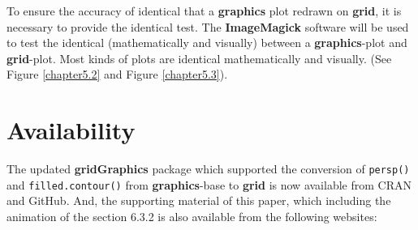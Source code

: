 \documentclass[11pt,twoside]{report}
\begin{document}
To ensure the accuracy of identical that a \textbf{graphics} plot redrawn on \textbf{grid}, it is necessary to provide the identical test. The \textbf{ImageMagick} software will be used to test the identical (mathematically and visually) between a \textbf{graphics}-plot and \textbf{grid}-plot. Most kinds of plots are identical mathematically and visually. (See Figure \ref{chapter5.2} and Figure \ref{chapter5.3}).

\section*{Availability}
The updated \textbf{gridGraphics} package which supported the conversion of \texttt{persp()} and \texttt{filled.contour()} from \textbf{graphics}-base to \textbf{grid} is now available from CRAN and GitHub. And, the supporting material of this paper, which including the animation of the section 6.3.2 is also available from the following websites: \\
\begin{center}
     \\
     \\
    \\
\end{center}




\nocite{hearn1997m}


\end{document}
